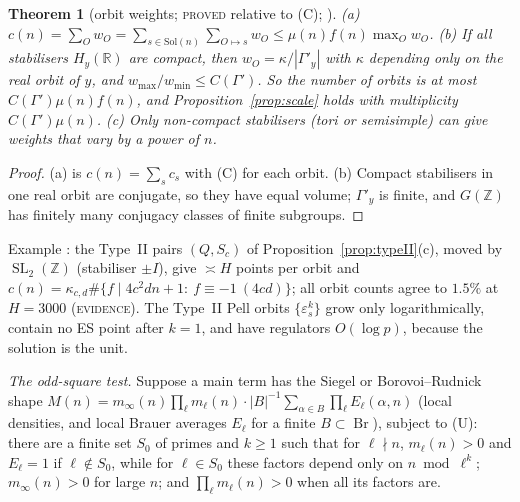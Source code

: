 \documentclass[10pt,reqno]{amsart}
\newtheorem{theorem}{Theorem}[section]
\theoremstyle{definition}
\numberwithin{equation}{section}
\newcommand{\Z}{\mathbb Z}
\newcommand{\R}{\mathbb R}
\DeclareMathOperator{\SL}{SL}
\DeclareMathOperator{\Br}{Br}
\newcommand{\status}[1]{\textup{\textsc{#1}}}
\begin{document}
\begin{theorem}[orbit weights; \status{proved} relative to (C); {\cite[Thm.~3.1]{LF}}]\label{thm:orbitweight}
\textup{(a)} $c(n)=\sum_Ow_O=\sum_{s\in\mathrm{Sol}(n)}\sum_{O\mapsto s}w_O\le\mu(n)f(n)\max_Ow_O$.
\textup{(b)} If all stabilisers $H_y(\R)$ are compact, then $w_O=\kappa/|\Gamma'_y|$
with $\kappa$ depending only on the real orbit of $y$, and
$w_{\max}/w_{\min}\le C(\Gamma')$. So the number of orbits is at most
$C(\Gamma')\mu(n)f(n)$, and Proposition~\ref{prop:scale} holds with
multiplicity $C(\Gamma')\mu(n)$.
\textup{(c)} Only non-compact stabilisers (tori or semisimple) can give
weights that vary by a power of $n$.
\end{theorem}
\begin{proof}
(a) is $c(n)=\sum_sc_s$ with (C) for each orbit. (b) Compact stabilisers in
one real orbit are conjugate, so they have equal volume; $\Gamma'_y$ is finite,
and $G(\Z)$ has finitely many conjugacy classes of finite subgroups.
\end{proof}
Example \cite[\S4]{LF}: the Type~II pairs $(Q,S_c)$ of
Proposition~\ref{prop:typeII}(c), moved by $\SL_2(\Z)$ (stabiliser $\pm I$),
give $\asymp H$ points per orbit and
$c(n)=\kappa_{c,d}\#\{f\mid4c^2dn+1:\ f\equiv-1\ (4cd)\}$; all orbit counts agree
to $1.5\%$ at $H=3000$ (\status{evidence}). The Type~II Pell orbits $\{\varepsilon_s^k\}$ grow only
logarithmically, contain no ES point after $k=1$, and have regulators
$O(\log p)$, because the solution is the unit.

\emph{The odd-square test.} Suppose a main term has the Siegel or
Borovoi--Rudnick shape \cite{BR}
$M(n)=m_\infty(n)\prod_\ell m_\ell(n)\cdot|B|^{-1}\sum_{\alpha\in B}\prod_\ell E_\ell(\alpha,n)$
(local densities, and local Brauer averages $E_\ell$ for a finite
$B\subset\Br$), subject to \textup{(U)}: there are a finite set $S_0$ of primes
and $k\ge1$ such that for $\ell\nmid n$, $m_\ell(n)>0$ and $E_\ell=1$ if
$\ell\notin S_0$, while for $\ell\in S_0$ these factors depend only on
$n\bmod\ell^k$; $m_\infty(n)>0$ for large $n$; and $\prod_\ell m_\ell(n)>0$ when
all its factors are.
\end{document}
